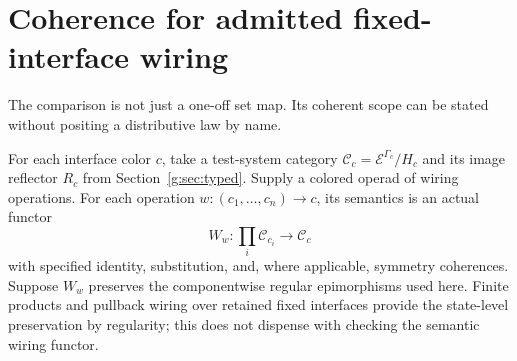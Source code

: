 \documentclass[11pt]{article}
\theoremstyle{definition}
\theoremstyle{remark}\newtheorem{remark}[theorem]{Remark}
\newcommand{\E}{\mathcal E}
\newcommand{\C}{\mathcal C}
\begin{document}
\section{Coherence for admitted fixed-interface wiring}
The comparison is not just a one-off set map. Its coherent scope can be
stated without positing a distributive law by name.

For each interface color $c$, take a test-system category
$\C_c=\E^{\Gamma_c}/H_c$ and its image reflector $R_c$ from
Section~\ref{g:sec:typed}. Supply a colored operad of wiring operations. For each
operation $w:(c_1,\ldots,c_n)\to c$, its semantics is an actual functor
\[
 W_w:\prod_i\C_{c_i}\longrightarrow\C_c
\]
with specified identity, substitution, and, where applicable, symmetry
coherences. Suppose $W_w$ preserves the componentwise regular
epimorphisms used here. Finite products and pullback wiring over retained
fixed interfaces provide the state-level preservation by regularity;
this does not dispense with checking the semantic wiring functor.
\end{document}
